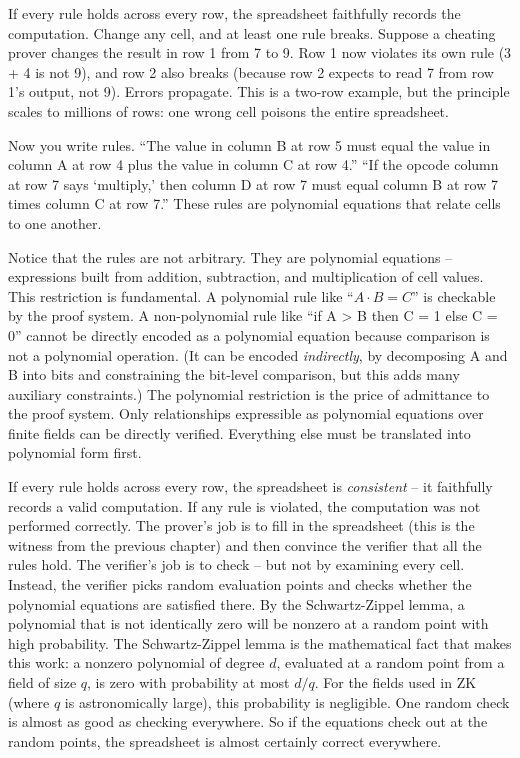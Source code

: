 \documentclass[
  11pt,
  openany]{report}
\begin{document}
If every rule holds across every row, the spreadsheet faithfully records the
computation. Change any cell, and at least one rule breaks. Suppose a cheating
prover changes the result in row 1 from 7 to 9. Row 1 now violates its own rule
(3 + 4 is not 9), and row 2 also breaks (because row 2 expects to read 7 from
row 1's output, not 9). Errors propagate. This is a two-row example, but the
principle scales to millions of rows: one wrong cell poisons the entire
spreadsheet.

Now you write rules. ``The value in column B at row 5 must equal the value in
column A at row 4 plus the value in column C at row 4.'' ``If the opcode column
at row 7 says `multiply,' then column D at row 7 must equal column B at row 7
times column C at row 7.'' These rules are polynomial equations that relate
cells to one another.

Notice that the rules are not arbitrary. They are polynomial equations --
expressions built from addition, subtraction, and multiplication of cell values.
This restriction is fundamental. A polynomial rule like ``\(A \cdot B = C\)'' is
checkable by the proof system. A non-polynomial rule like ``if A \textgreater{}
B then C = 1 else C = 0'' cannot be directly encoded as a polynomial equation
because comparison is not a polynomial operation. (It can be encoded
\emph{indirectly}, by decomposing A and B into bits and constraining the
bit-level comparison, but this adds many auxiliary constraints.) The polynomial
restriction is the price of admittance to the proof system. Only relationships
expressible as polynomial equations over finite fields can be directly verified.
Everything else must be translated into polynomial form first.

If every rule holds across every row, the spreadsheet is \emph{consistent} -- it
faithfully records a valid computation. If any rule is violated, the computation
was not performed correctly. The prover's job is to fill in the spreadsheet
(this is the witness from the previous chapter) and then convince the verifier
that all the rules hold. The verifier's job is to check -- but not by examining
every cell. Instead, the verifier picks random evaluation points and checks
whether the polynomial equations are satisfied there. By the Schwartz-Zippel
lemma, a polynomial that is not identically zero will be nonzero at a random
point with high probability. The Schwartz-Zippel lemma is the mathematical fact
that makes this work: a nonzero polynomial of degree \(d\), evaluated at a
random point from a field of size \(q\), is zero with probability at most
\(d/q\). For the fields used in ZK (where \(q\) is astronomically large), this
probability is negligible. One random check is almost as good as checking
everywhere. So if the equations check out at the random points, the spreadsheet
is almost certainly correct everywhere.
\end{document}
